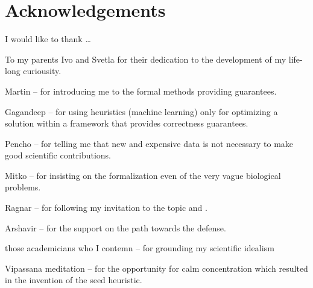 
\bigskip

\begingroup
\let\clearpage\relax
\let\cleardoublepage\relax
\let\cleardoublepage\relax
\chapter*{Acknowledgements}

\def\thanks#1{%
\begingroup
\leftskip1em
\noindent #1
\par
\endgroup
}

I would like to thank \dots

To my parents Ivo and Svetla for their dedication to the development of my
life-long curiousity.

Martin -- for introducing me to the formal methods providing guarantees.

Gagandeep -- for using heuristics (machine learning) only for optimizing a
solution within a framework that provides correctness guarantees.

Pencho -- for telling me that new and expensive data is not necessary to make
good scientific contributions.

Mitko -- for insisting on the formalization even of the very vague biological
problems.

Ragnar -- for following my invitation to the topic and .

Arshavir -- for the support on the path towards the defense.

those academicians who I contemn -- for grounding my scientific idealism 

Vipassana meditation -- for the opportunity for calm concentration which
resulted in the invention of the seed heuristic.


\endgroup
